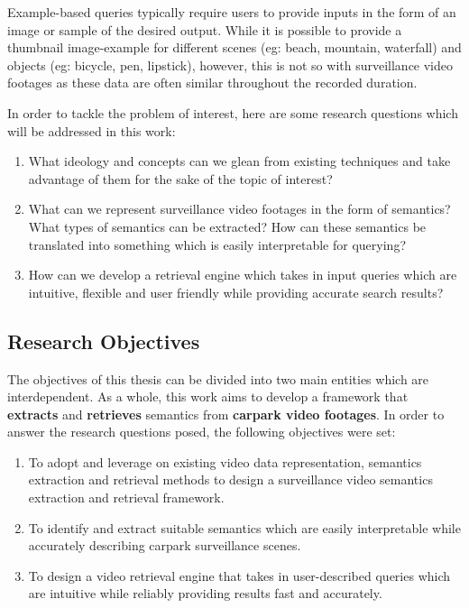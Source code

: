 Example-based queries typically require users to provide inputs in the form of an image or sample of the desired output. While it is possible to provide a thumbnail image-example for different scenes (eg: beach, mountain, waterfall) and objects (eg: bicycle, pen, lipstick), however, this is not so with surveillance video footages as these data are often similar throughout the recorded duration. 

In order to tackle the problem of interest, here are some research questions which will be addressed in this work:
\begin{enumerate}  
\item What ideology and concepts can we glean from existing techniques and take advantage of them for the sake of the topic of interest? 
\item What can we represent surveillance video footages in the form of semantics? What types of semantics can be extracted? How can these semantics be translated into something which is easily interpretable for querying?
\item How can we develop a retrieval engine which takes in input queries which are intuitive, flexible and user friendly while providing accurate search results? 
\end{enumerate}



\subsection{Research Objectives}
The objectives of this thesis can be divided into two main entities which are interdependent. As a whole, this work aims to develop a framework that \textbf{extracts} and \textbf{retrieves} semantics from \textbf{carpark video footages}. In order to answer the research questions posed, the following objectives were set:

\begin{enumerate}  
\item To adopt and leverage on existing video data representation, semantics extraction and retrieval methods to design a surveillance video semantics extraction and retrieval framework.   
\item To identify and extract suitable semantics which are easily interpretable while accurately describing carpark surveillance scenes.
\item To design a video retrieval engine that takes in user-described queries which are intuitive while reliably providing results fast and accurately. 
\end{enumerate}

